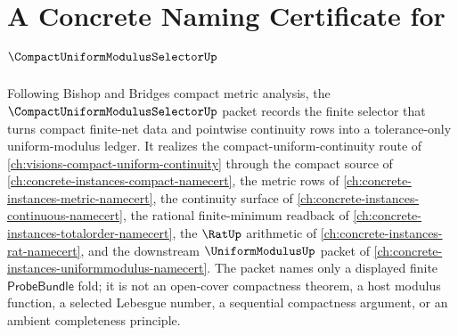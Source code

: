 \chapter{A Concrete Naming Certificate for $\CompactUniformModulusSelectorUp$}
\label{ch:concrete-instances-compact-uniform-modulus-selector-namecert}

Following Bishop and Bridges compact metric analysis, the $\CompactUniformModulusSelectorUp$ packet records the finite selector that turns compact finite-net data and pointwise continuity rows into a tolerance-only uniform-modulus ledger. It realizes the compact-uniform-continuity route of \autoref{ch:visions-compact-uniform-continuity} through the compact source of \autoref{ch:concrete-instances-compact-namecert}, the metric rows of \autoref{ch:concrete-instances-metric-namecert}, the continuity surface of \autoref{ch:concrete-instances-continuous-namecert}, the rational finite-minimum readback of \autoref{ch:concrete-instances-totalorder-namecert}, the $\RatUp$ arithmetic of \autoref{ch:concrete-instances-rat-namecert}, and the downstream $\UniformModulusUp$ packet of \autoref{ch:concrete-instances-uniformmodulus-namecert}. The packet names only a displayed finite $\mathsf{ProbeBundle}$ fold; it is not an open-cover compactness theorem, a host modulus function, a selected Lebesgue number, a sequential compactness argument, or an ambient completeness principle.


